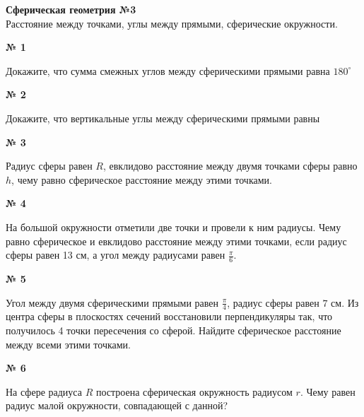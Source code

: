


    \begin{center}
        \textbf{Сферическая геометрия №3}\\
        Расстояние между точками, углы между прямыми, сферические окружности.
    \end{center}

    \begin{center}
        \textbf{№ 1}
    \end{center}

    Докажите, что сумма смежных углов между сферическими прямыми равна $180^\circ$

    \begin{center}
        \textbf{№ 2}
    \end{center}

    Докажите, что вертикальные углы между сферическими прямыми равны

    \begin{center}
        \textbf{№ 3}
    \end{center}

    Радиус сферы равен $R$, евклидово расстояние между двумя точками сферы равно $h$,
    чему равно сферическое расстояние между этими точками.

    \begin{center}
        \textbf{№ 4}
    \end{center}

    На большой окружности отметили две точки и провели к ним радиусы.
    Чему равно сферическое и евклидово расстояние между этими точками, если радиус сферы равен 13 см,
    а угол между радиусами равен $\frac{\pi}{6}$.

    \begin{center}
        \textbf{№ 5}
    \end{center}

    Угол между двумя сферическими прямыми равен $\frac{\pi}{4}$, радиус сферы равен $7$ см.
    Из центра сферы в плоскостях сечений восстановили перпендикуляры так, что получилось 4 точки пересечения со сферой.
    Найдите сферическое расстояние между всеми этими точками.

    \begin{center}
        \textbf{№ 6}
    \end{center}

    На сфере радиуса $R$ построена сферическая окружность радиусом $r$.
    Чему равен радиус малой окружности, совпадающей с данной?

